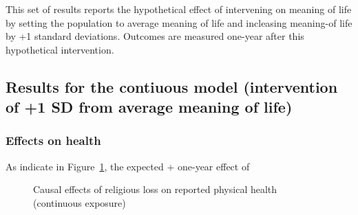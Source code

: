 \documentclass[
  singlecolumn,
  9pt]{scrartcl}
\begin{document}
This set of results reports the hypothetical effect of intervening on
meaning of life by setting the population to average meaning of life and
incleasing meaning-of life by +1 standard deviations. Outcomes are
measured one-year after this hypothetical intervention.

\subsection{Results for the contiuous model (intervention of +1 SD from
average meaning of
life)}\label{results-for-the-contiuous-model-intervention-of-1-sd-from-average-meaning-of-life}

\subsubsection{Effects on health}\label{effects-on-health}

As indicate in Figure~\ref{fig-results-health_con}, the expected +
one-year effect of

\begin{figure}


\caption{\label{fig-results-health_con}Causal effects of religious loss
on reported physical health (continuous exposure)}

\end{figure}%
\end{document}

